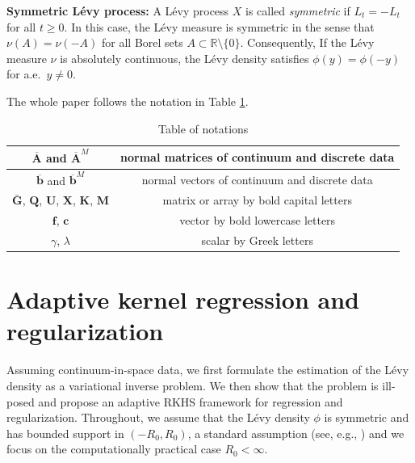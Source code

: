 \documentclass[12pt]{article}
\def\Abar{ {\overline{A}} }
\def\bbar{ {\overline{b}} }
\numberwithin{equation}{section}
\numberwithin{theorem}{section}
\begin{document}
\noindent\textbf{Symmetric L\'evy process: } A L\'evy process $X$ is called \emph{symmetric} if $L_t = -L_t$ for all $t\ge 0$.
In this case, the L\'evy measure is symmetric in the sense that $\nu(A)=\nu(-A)$ for all Borel sets
$A\subset \mathbb{R}\setminus\{0\}$. Consequently, If the L\'evy measure $\nu$ is absolutely continuous, the L\'evy density satisfies
$\phi(y)=\phi(-y)$ for a.e.\ $y\neq 0$.
 

\noindent The whole paper follows the notation in Table \ref{tab:notaion}.
\begin{table}[H]
    \centering
    \caption{Table of notations}
    \begin{tabular}{cc}
        \toprule
       $\mathbf{\Abar}$ and $\mathbf{\Abar}^M$	& normal matrices of continuum and discrete data  \\
        \hline
        $\mathbf{\bbar}$ and $\mathbf{\bbar}^M$  & normal vectors of continuum and discrete data \\
        \hline
        $\bar{\mathbf{G}}$, $\mathbf{Q}$, $\mathbf{U}$, $\mathbf{X}$, $\mathbf{K}$, $\mathbf{M}$ & matrix or array by bold capital letters  \\
        \hline
        $\mathbf{f}$, $\mathbf{c}$ & vector by bold lowercase letters \\
        \hline
        $\gamma$, $\lambda$  & scalar by Greek letters\\
        \bottomrule
    \end{tabular}
    \vspace{0cm}
    \label{tab:notaion}
\end{table}

\section{Adaptive kernel regression and regularization
}
\label{Inverseproblem}
Assuming continuum-in-space data, we first formulate the estimation of the L\'evy density as a variational inverse problem. We then show that the problem is ill-posed and propose an adaptive RKHS framework for regression and regularization. Throughout, we assume that the L\'evy density $\phi$ is symmetric and has bounded support in $(-R_0, R_0)$, a standard assumption (see, e.g., \cite{zhang2013risk}) and we focus on the computationally practical case $R_0 < \infty$. 

\end{document}
